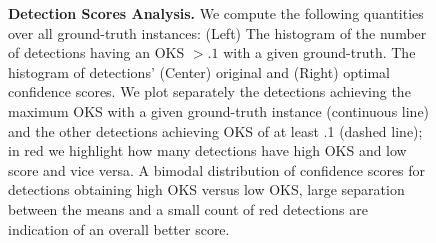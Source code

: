\documentclass[10pt,onecolumn,letterpaper]{article}
\begin{document}
\begin{figure}[h!]
\centering
{}
\caption{{\small \textbf{Detection Scores Analysis.} We compute the following quantities over all ground-truth instances:
(Left) The histogram of the number of detections having an OKS $>.1$ with a given ground-truth. The histogram of detections'
(Center) original and (Right) optimal confidence scores. We plot separately the detections achieving the maximum OKS with a
given ground-truth instance (continuous line) and the other detections achieving OKS of at least .1 (dashed line);
in red we highlight how many detections have high OKS and low score and vice versa. A bimodal distribution of confidence scores for detections
obtaining high OKS versus low OKS, large separation between the means and a small count of red detections are indication of an overall better score.}}
\end{figure}
\end{document}
